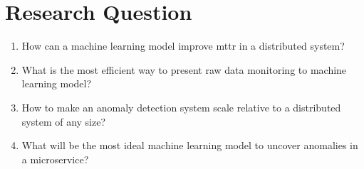 
\section{Research Question}


\begin{enumerate}[leftmargin=*,label=\textbf{RQ\arabic*:}]

\item How can a machine learning model improve \ac{mttr} in a distributed system?

\item What is the most efficient way to present raw data monitoring to machine learning model?

\item How to make an anomaly detection system scale relative to a distributed system of any size?

\item What will be the most ideal machine learning model to uncover anomalies in a microservice?

\end{enumerate}


